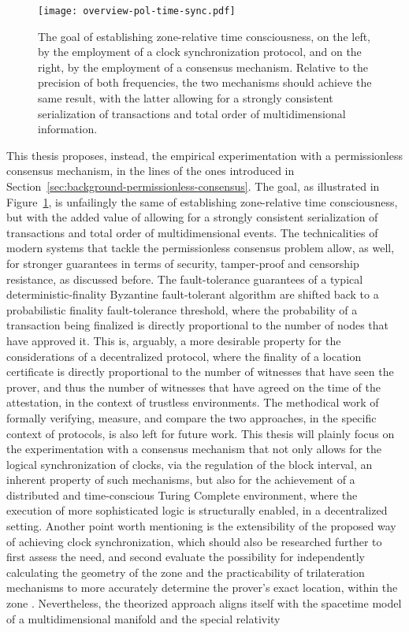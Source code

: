 \begin{figure}[ht]
    \begin{center}
    \texttt{[image: overview-pol-time-sync.pdf]}
    \caption{The goal of establishing zone-relative time consciousness, on the left, by the employment of a clock synchronization protocol, and on the right, by the employment of a consensus mechanism. Relative to the precision of both frequencies, the two mechanisms should achieve the same result, with the latter allowing for a strongly consistent serialization of transactions and total order of multidimensional information.}
    \label{fig:proof-of-location-overview-time-sync}
    \end{center}
\end{figure}

This thesis proposes, instead, the empirical experimentation with a permissionless consensus mechanism, in the lines of the ones introduced in Section~\ref{sec:background-permissionless-consensus}. The goal, as illustrated in Figure~\ref{fig:proof-of-location-overview-time-sync}, is unfailingly the same of establishing zone-relative time consciousness, but with the added value of allowing for a strongly consistent serialization of transactions and total order of multidimensional events. The technicalities of modern systems that tackle the permissionless consensus problem allow, as well, for stronger guarantees in terms of security, tamper-proof and censorship resistance, as discussed before. The fault-tolerance guarantees of a typical deterministic-finality Byzantine fault-tolerant algorithm are shifted back to a probabilistic finality fault-tolerance threshold, where the probability of a transaction being finalized is directly proportional to the number of nodes that have approved it. This is, arguably, a more desirable property for the considerations of a decentralized \pol{} protocol, where the finality of a location certificate is directly proportional to the number of witnesses that have seen the prover, and thus the number of witnesses that have agreed on the time of the attestation, in the context of trustless environments. The methodical work of formally verifying, measure, and compare the two approaches, in the specific context of \pol{} protocols, is also left for future work. This thesis will plainly focus on the experimentation with a consensus mechanism that not only allows for the logical synchronization of clocks, via the regulation of the block interval, an inherent property of such mechanisms, but also for the achievement of a distributed and time-conscious Turing Complete environment, where the execution of more sophisticated logic is structurally enabled, in a decentralized setting. Another point worth mentioning is the extensibility of the proposed way of achieving clock synchronization, which should also be researched further to first assess the need, and second evaluate the possibility for independently calculating the geometry of the zone and the practicability of trilateration mechanisms to more accurately determine the prover's exact location, within the zone \cite{foam-white-paper}. Nevertheless, the theorized approach aligns itself with the spacetime model of a multidimensional manifold and the special relativity 